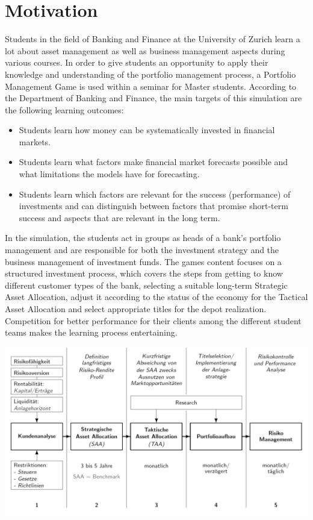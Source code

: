 \section{Motivation}
Students in the field of Banking and Finance at the University of Zurich learn a lot about asset management as well as business management aspects during various courses. In order to give students an opportunity to apply their knowledge and understanding of the portfolio management process, a Portfolio Management Game is used within a seminar for Master students. According to the Department of Banking and Finance, the main targets of this simulation are the following learning outcomes:
\begin{itemize}
  \item Students learn how money can be systematically invested in financial markets.
  \item Students learn what factors make financial market forecasts possible and what limitations the models have for forecasting.
  \item Students learn which factors are relevant for the success (performance) of investments and can distinguish between factors that promise short-term success and aspects that are relevant in the long term.
\end{itemize}

In the simulation, the students act in groups as heads of a bank’s portfolio management and are responsible for both the investment strategy and the business management of investment funds. The games content focuses on a structured investment process, which covers the steps from getting to know different customer types of the bank, selecting a suitable long-term Strategic Asset Allocation, adjust it according to the status of the economy for the Tactical Asset Allocation and select appropriate titles for the depot realization. Competition for better performance for their clients among the different student teams makes the learning process entertaining.

\begin{center}
  \includegraphics[scale=0.5]{img/private_banking_process.png}
\end{center}


